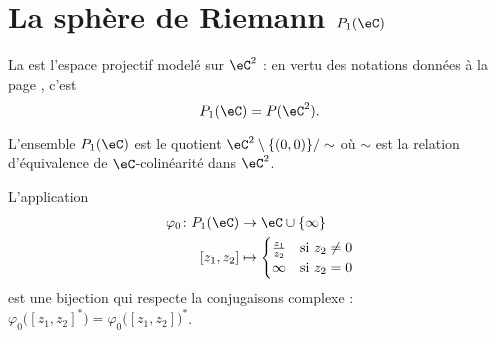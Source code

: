 
\section{La sphère de Riemann \( P_1(\eC)\)}

\begin{definition}      \label{DEFooSZGNooTzFYbh}
	La  est l'espace projectif modelé sur \( \eC^2\) : en vertu des notations données à la page \pageref{PgNotimesjNtMoW}, c'est
	\begin{equation}
		P_1(\eC)=P(\eC^2).
	\end{equation}
\end{definition}

L'ensemble \( P_1(\eC)\) est le quotient \( \eC^2\setminus\{ (0,0) \}/\sim\) où \( \sim\) est la relation d'équivalence de \( \eC\)-colinéarité dans \( \eC^2\).

\begin{lemma}       \label{LEMooKWZDooEIraSJ}
	L'application
	\begin{equation}        \label{EQooKJIZooZjhzuU}
		\begin{aligned}
			\varphi_0\colon P_1(\eC) & \to \eC\cup\{ \infty \}           \\
			[z_1,z_2]                & \mapsto \begin{cases}
				\frac{ z_1 }{ z_2 } & \text{si } z_2\neq 0 \\
				\infty              & \text{si } z_2=0
			\end{cases}
		\end{aligned}
	\end{equation}
	est une bijection qui respecte la conjugaisons complexe : \( \varphi_0\big( [z_1,z_2]^* \big)=\varphi_0\big( [z_1,z_2] \big)^*\).
\end{lemma}

